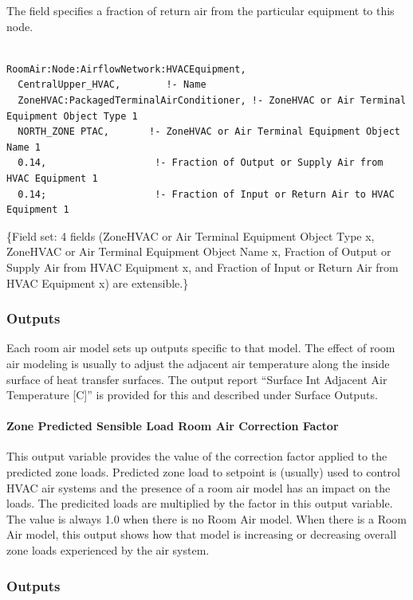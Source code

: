 The field specifies a fraction of return air from the particular equipment to this node.

\begin{lstlisting}

RoomAir:Node:AirflowNetwork:HVACEquipment,
  CentralUpper_HVAC,        !- Name
  ZoneHVAC:PackagedTerminalAirConditioner, !- ZoneHVAC or Air Terminal Equipment Object Type 1
  NORTH_ZONE PTAC,       !- ZoneHVAC or Air Terminal Equipment Object Name 1
  0.14,                   !- Fraction of Output or Supply Air from HVAC Equipment 1 
  0.14;                   !- Fraction of Input or Return Air to HVAC Equipment 1
\end{lstlisting}

\{Field set: 4 fields (ZoneHVAC or Air Terminal Equipment Object Type x, ZoneHVAC or Air Terminal Equipment Object Name x, Fraction of Output or Supply Air from HVAC Equipment x, and Fraction of Input or Return Air from HVAC Equipment x) are extensible.\}

\subsubsection{Outputs}\label{outputs-1-023}

Each room air model sets up outputs specific to that model. The effect of room air modeling is usually to adjust the adjacent air temperature along the inside surface of heat transfer surfaces. The output report ``Surface Int Adjacent Air Temperature {[}C{]}'' is provided for this and described under Surface Outputs.

\paragraph{Zone Predicted Sensible Load Room Air Correction Factor}\label{zone-predicted-sensible-load-room-air-correction-factor}

This output variable provides the value of the correction factor applied to the predicted zone loads. Predicted zone load to setpoint is (usually) used to control HVAC air systems and the presence of a room air model has an impact on the loads. The predicited loads are multiplied by the factor in this output variable. The value is always 1.0 when there is no Room Air model. When there is a Room Air model, this output shows how that model is increasing or decreasing overall zone loads experienced by the air system.

\subsubsection{Outputs}\label{outputs-2-019}

